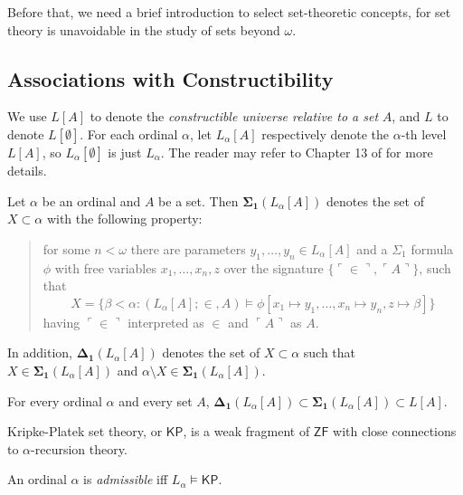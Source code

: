 \documentclass[12pt]{article}
\numberwithin{equation}{section}
\begin{document}
Before that, we need a brief introduction to select set-theoretic concepts, for set theory is unavoidable in the study of sets beyond $\omega$.

\subsection{Associations with Constructibility}

\begin{defi}
We use $L[A]$ to denote the \emph{constructible universe relative to a set} $A$, and $L$ to denote $L[\emptyset]$. For each ordinal $\alpha$, let $L_{\alpha}[A]$ respectively denote the $\alpha$-th level $L[A]$, so $L_{\alpha}[\emptyset]$ is just $L_{\alpha}$. The reader may refer to Chapter 13 of \cite{jech} for more details.
\end{defi}

\begin{defi}
Let $\alpha$ be an ordinal and $A$ be a set. Then $\mathbf{\Sigma_1}(L_{\alpha}[A])$ denotes the set of $X \subset \alpha$ with the following property: 
\begin{quote}
    for some $n < \omega$ there are parameters $y_1, \dots, y_n \in L_{\alpha}[A]$ and a $\Sigma_1$ formula $\phi$ with free variables $x_1, \dots, x_{n}, z$ over the signature $\{\ulcorner \in \urcorner, \ulcorner A \urcorner\}$, such that 
    \begin{equation*}
        X = \{\beta < \alpha : (L_{\alpha}[A]; \in, A) \models \phi[x_1 \mapsto y_1, \dots, x_n \mapsto y_n, z \mapsto \beta]\}
    \end{equation*}
    having $\ulcorner \in \urcorner$ interpreted as $\in$ and $\ulcorner A \urcorner$ as $A$.
\end{quote}
In addition, $\mathbf{\Delta_1}(L_{\alpha}[A])$ denotes the set of $X \subset \alpha$ such that $X \in \mathbf{\Sigma_1}(L_{\alpha}[A])$ and $\alpha \setminus X \in \mathbf{\Sigma_1}(L_{\alpha}[A])$.
\end{defi}

\begin{fact}
For every ordinal $\alpha$ and every set $A$, $\mathbf{\Delta_1}(L_{\alpha}[A]) \subset \mathbf{\Sigma_1}(L_{\alpha}[A]) \subset L[A]$.
\end{fact}

Kripke-Platek set theory, or $\mathsf{KP}$, is a weak fragment of $\mathsf{ZF}$ with close connections to $\alpha$-recursion theory.

\begin{defi}
An ordinal $\alpha$ is \emph{admissible} iff $L_{\alpha} \models \mathsf{KP}$.
\end{defi}
\end{document}
